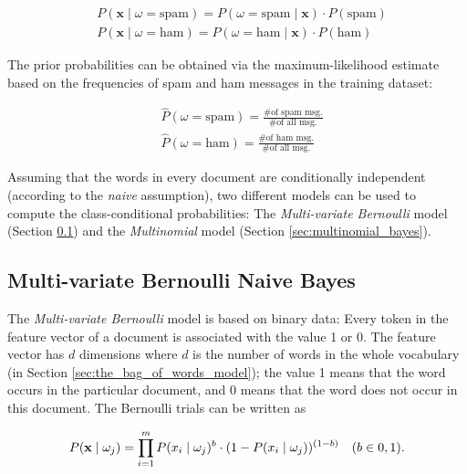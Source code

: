 \documentclass{article}
\begin{document}
\begin{equation}
\begin{split} 
    & P(\textbf{x} \mid \omega = \text{spam}) = P(\omega = \text{spam} \mid \textbf{x}) \cdot P(\text{spam}) \\
    & P(\textbf{x} \mid \omega = \text{ham}) = P(\omega = \text{ham} \mid \textbf{x}) \cdot P(\text{ham})
\end{split}
\end{equation}

The prior probabilities can be obtained via the maximum-likelihood estimate based on the frequencies of spam and ham messages in the training dataset:

\begin{equation}
\begin{split} 
  & \hat{P}(\omega = \text{spam}) = \frac {\text{\# of spam msg.}}{\text{\# of all msg.}} \\
   &  \hat{P}(\omega = \text{ham}) = \frac {\text{\# of ham msg.}}{\text{\# of all msg.}}
\end{split}
\end{equation}

Assuming that the words in every document are conditionally independent (according to the \emph{naive} assumption), two different models can be used to compute the class-conditional probabilities: The \emph{Multi-variate Bernoulli} model (Section \ref{sec:bernoulli_bayes}) and the \emph{Multinomial} model (Section \ref{sec:multinomial_bayes}). 



\subsection{Multi-variate Bernoulli Naive Bayes}
\label{sec:bernoulli_bayes}

The \emph{Multi-variate Bernoulli} model is based on binary data: Every token in the feature vector of a document is associated with the value 1 or 0. The  feature vector has $d$ dimensions where $d$ is the number of words in the whole vocabulary (in Section \ref{sec:the_bag_of_words_model}); the value 1 means that the word occurs in the particular document, and 0 means that the word does
not occur in this document. The Bernoulli trials can be written as

\begin{equation} P(\textbf x \mid \omega_j) = \prod_{i=1}^{m} P(x_i \mid \omega_j)^b \cdot (1-P(x_i \mid  \omega_j))^{(1-b)}  \quad (b \in {0,1}).
\end{equation}
\end{document}
